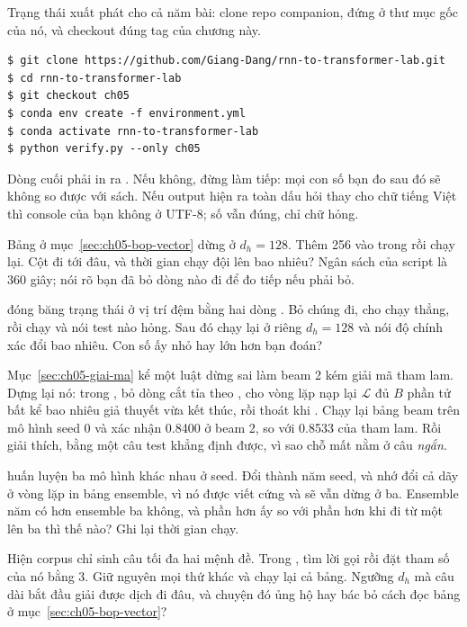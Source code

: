\tierapply

Trạng thái xuất phát cho cả năm bài: clone repo companion, đứng ở thư mục gốc
của nó, và checkout đúng tag của chương này.

\begin{verbatim}
$ git clone https://github.com/Giang-Dang/rnn-to-transformer-lab.git
$ cd rnn-to-transformer-lab
$ git checkout ch05
$ conda env create -f environment.yml
$ conda activate rnn-to-transformer-lab
$ python verify.py --only ch05
\end{verbatim}

Dòng cuối phải in ra . Nếu không, đừng làm tiếp: mọi con số
bạn đo sau đó sẽ không so được với sách. Nếu output hiện ra toàn dấu hỏi thay
cho chữ tiếng Việt thì console của bạn không ở UTF-8; số vẫn đúng, chỉ chữ
hỏng.

\begin{bt}
  \item Bảng ở mục~\ref{sec:ch05-bop-vector} dừng ở \(d_h = 128\). Thêm 256 vào
     trong  rồi chạy lại. Cột
     đi tới đâu, và thời gian chạy đội lên bao nhiêu? Ngân sách của
    script là 360 giây; nói rõ bạn đã bỏ dòng nào đi để đo tiếp nếu phải bỏ.

  \item {} đóng băng trạng thái ở vị trí đệm bằng hai dòng
    . Bỏ chúng đi, cho  chạy thẳng, rồi chạy
     và nói test nào hỏng. Sau đó
    chạy lại  ở riêng \(d_h = 128\) và nói độ chính
    xác đổi bao nhiêu. Con số ấy nhỏ hay lớn hơn bạn đoán?

  \item Mục~\ref{sec:ch05-giai-ma} kể một luật dừng sai làm beam 2 kém giải mã
    tham lam. Dựng lại nó: trong , bỏ dòng cắt tỉa theo
    , cho vòng lặp nạp lại \(\mathcal{L}\) đủ \(B\) phần
    tử bất kể bao nhiêu giả thuyết vừa kết thúc, rồi thoát khi
    . Chạy lại bảng beam trên mô hình seed 0 và xác
    nhận 0.8400 ở beam 2, so với 0.8533 của tham lam. Rồi giải thích, bằng một
    câu test khẳng định được, vì sao chỗ mất nằm ở câu \emph{ngắn}.

  \item {} huấn luyện ba mô hình khác nhau ở seed. Đổi
     thành năm seed, và nhớ đổi cả dãy  ở vòng lặp
    in bảng ensemble, vì nó được viết cứng và sẽ vẫn dừng ở ba. Ensemble năm có
    hơn ensemble ba không, và phần hơn ấy so với phần hơn khi đi từ một lên ba
    thì thế nào? Ghi lại thời gian chạy.

  \item Hiện corpus chỉ sinh câu tối đa hai mệnh đề. Trong
    , tìm lời gọi  rồi đặt
    tham số  của nó bằng 3. Giữ nguyên mọi thứ khác và chạy
    lại cả bảng. Ngưỡng \(d_h\) mà câu dài bắt đầu giải được dịch đi đâu, và
    chuyện đó ủng hộ hay bác bỏ cách đọc bảng ở
    mục~\ref{sec:ch05-bop-vector}?
\end{bt}

